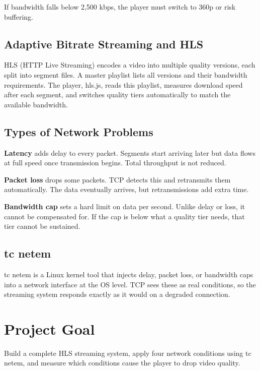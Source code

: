 \documentclass[12pt]{article}
\begin{document}
If bandwidth falls below 2,500 kbps, the player must switch to 360p or risk buffering.

\subsection{Adaptive Bitrate Streaming and HLS}

HLS (HTTP Live Streaming) encodes a video into multiple quality versions, each split into segment files. A master playlist lists all versions and their bandwidth requirements. The player, hls.js, reads this playlist, measures download speed after each segment, and switches quality tiers automatically to match the available bandwidth.

\subsection{Types of Network Problems}

\textbf{Latency} adds delay to every packet. Segments start arriving later but data flows at full speed once transmission begins. Total throughput is not reduced.

\textbf{Packet loss} drops some packets. TCP detects this and retransmits them automatically. The data eventually arrives, but retransmissions add extra time.

\textbf{Bandwidth cap} sets a hard limit on data per second. Unlike delay or loss, it cannot be compensated for. If the cap is below what a quality tier needs, that tier cannot be sustained.

\subsection{tc netem}

tc netem is a Linux kernel tool that injects delay, packet loss, or bandwidth caps into a network interface at the OS level. TCP sees these as real conditions, so the streaming system responds exactly as it would on a degraded connection.

\section{Project Goal}

Build a complete HLS streaming system, apply four network conditions using tc netem, and measure which conditions cause the player to drop video quality.
\end{document}
